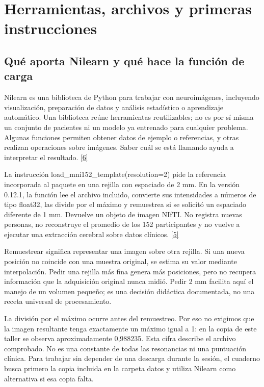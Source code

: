 \chapter[Herramientas y archivos]{Herramientas, archivos y primeras instrucciones}

\label{cap:herramientas}

\section{Qué aporta Nilearn y qué hace la función de carga}

Nilearn es una biblioteca de Python para trabajar con neuroimágenes, incluyendo visualización, preparación de datos y análisis estadístico o aprendizaje automático. Una biblioteca reúne herramientas reutilizables; no es por sí misma un conjunto de pacientes ni un modelo ya entrenado para cualquier problema. Algunas funciones permiten obtener datos de ejemplo o referencias, y otras realizan operaciones sobre imágenes. Saber cuál se está llamando ayuda a interpretar el resultado. \hyperlink{refR6}{[6]}


La instrucción load\_mni152\_template(resolution=2) pide la referencia incorporada al paquete en una rejilla con espaciado de 2 mm. En la versión 0.12.1, la función lee el archivo incluido, convierte sus intensidades a números de tipo float32, las divide por el máximo y remuestrea si se solicitó un espaciado diferente de 1 mm. Devuelve un objeto de imagen NIfTI. No registra nuevas personas, no reconstruye el promedio de los 152 participantes y no vuelve a ejecutar una extracción cerebral sobre datos clínicos. \hyperlink{refR5}{[5]}


Remuestrear significa representar una imagen sobre otra rejilla. Si una nueva posición no coincide con una muestra original, se estima su valor mediante interpolación. Pedir una rejilla más fina genera más posiciones, pero no recupera información que la adquisición original nunca midió. Pedir 2 mm facilita aquí el manejo de un volumen pequeño; es una decisión didáctica documentada, no una receta universal de procesamiento.


La división por el máximo ocurre antes del remuestreo. Por eso no exigimos que la imagen resultante tenga exactamente un máximo igual a 1: en la copia de este taller se observa aproximadamente 0,988235. Esta cifra describe el archivo comprobado. No es una constante de todas las resonancias ni una puntuación clínica. Para trabajar sin depender de una descarga durante la sesión, el cuaderno busca primero la copia incluida en la carpeta datos y utiliza Nilearn como alternativa si esa copia falta.


